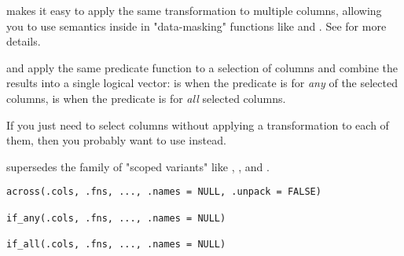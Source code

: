\documentclass[a4paper]{book}
\begin{document}
%
\begin{Description}
 makes it easy to apply the same transformation to multiple
columns, allowing you to use  semantics inside in "data-masking"
functions like  and . See  for
more details.

 and  apply the same
predicate function to a selection of columns and combine the
results into a single logical vector:  is  when
the predicate is  for \emph{any} of the selected columns, 
is  when the predicate is  for \emph{all} selected columns.

If you just need to select columns without applying a transformation to each
of them, then you probably want to use  instead.

 supersedes the family of "scoped variants" like
, , and .
\end{Description}
%
\begin{Usage}
\begin{verbatim}
across(.cols, .fns, ..., .names = NULL, .unpack = FALSE)

if_any(.cols, .fns, ..., .names = NULL)

if_all(.cols, .fns, ..., .names = NULL)
\end{verbatim}
\end{Usage}
%
\end{document}
